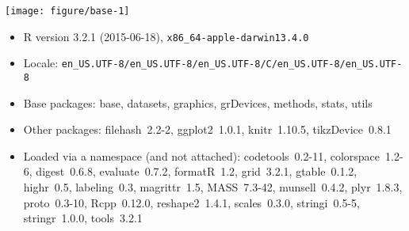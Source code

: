 \documentclass{article}\usepackage[]{graphicx}\usepackage[]{color}
\makeatletter
\def\maxwidth{ %
  \ifdim\Gin@nat@width>\linewidth
    \linewidth
  \else
    \Gin@nat@width
  \fi
}
\newenvironment{knitrout}{}{} %
\theoremstyle{rcode}
\makeatother
\begin{document}
\begin{knitrout}
\color{fgcolor}

{\centering \texttt{[image: figure/base-1]} 

}



\end{knitrout}

\begin{itemize}\raggedright
  \item R version 3.2.1 (2015-06-18), \verb|x86_64-apple-darwin13.4.0|
  \item Locale: \verb|en_US.UTF-8/en_US.UTF-8/en_US.UTF-8/C/en_US.UTF-8/en_US.UTF-8|
  \item Base packages: base, datasets, graphics, grDevices,
    methods, stats, utils
  \item Other packages: filehash~2.2-2, ggplot2~1.0.1,
    knitr~1.10.5, tikzDevice~0.8.1
  \item Loaded via a namespace (and not attached):
    codetools~0.2-11, colorspace~1.2-6, digest~0.6.8,
    evaluate~0.7.2, formatR~1.2, grid~3.2.1, gtable~0.1.2,
    highr~0.5, labeling~0.3, magrittr~1.5, MASS~7.3-42,
    munsell~0.4.2, plyr~1.8.3, proto~0.3-10, Rcpp~0.12.0,
    reshape2~1.4.1, scales~0.3.0, stringi~0.5-5, stringr~1.0.0,
    tools~3.2.1
\end{itemize}
\end{document}
